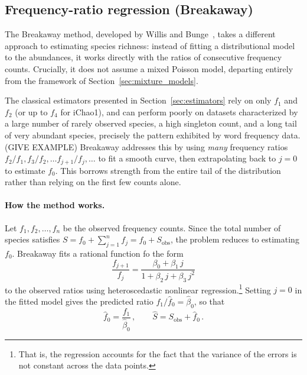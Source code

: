 \documentclass{article}
\begin{document}
{\subsection{Frequency-ratio regression (Breakaway)}\label{sec:breakaway}

The Breakaway method, developed by Willis and Bunge~\cite{willisbunge2015}, takes a different approach to estimating species richness: instead of fitting a distributional model to the abundances, it works directly with the ratios of consecutive frequency counts. Crucially, it does not assume a mixed Poisson model, departing entirely from the framework of Section~\ref{sec:mixture_models}.

The classical estimators presented in Section~\ref{sec:estimators} rely on only $f_1$ and $f_2$ (or up to $f_4$ for iChao1), and can perform poorly on datasets characterized by a large number of rarely observed species, a high singleton count, and a long tail of very abundant species, precisely the pattern exhibited by word frequency data. (GIVE EXAMPLE) Breakaway addresses this by using \emph{many} frequency ratios $f_2/f_1, f_3/f_2, \ldots f_{j+1}/f_{j}, \ldots$ to fit a smooth curve, then extrapolating back to $j = 0$ to estimate $f_0$. This borrows strength from the entire tail of the distribution rather than relying on the first few counts alone.

\paragraph{How the method works.}
Let $f_1, f_2, \ldots, f_n$ be the observed frequency counts. Since the total number of species satisfies $S = f_0 + \sum_{j=1}^{n} f_j = f_0 + S_{\mathrm{obs}}$, the problem reduces to estimating $f_0$. Breakaway fits a rational function fo the form
\begin{equation}\label{eq:breakaway_ratio}
    \frac{f_{j+1}}{f_j} = \frac{\beta_0 + \beta_1 \, j}{1 + \beta_2 
    \, j + \beta_3 \, j^2}
\end{equation}
to the observed ratios using heteroscedastic nonlinear regression.\footnote{That is, the regression accounts for the fact that the variance of the errors is not constant across the data points.} Setting $j = 0$ in the fitted model gives the predicted
ratio $f_1 / \hat{f}_0 = \hat{\beta}_0$, so that
\begin{equation}\label{eq:breakaway_f0}
    \hat{f}_0 = \frac{f_1}{\hat{\beta}_0}\,, \qquad
    \hat{S} = S_{\mathrm{obs}} + \hat{f}_0\,.
\end{equation}

}
\end{document}
